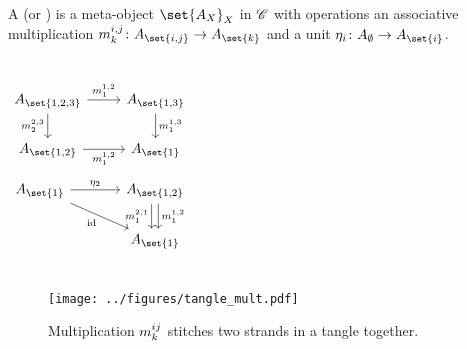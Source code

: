 \documentclass{beamer}
\begin{document}
\begin{frame}
        \begin{definition}\label{def:meta_algebra}
                A  (or ) is a meta-object
                $\set{A_X}_X$ in $\mathscr{C}$ with operations an associative
                multiplication $\map {\mult^{i,j}_{k}} {A_{\set{i,j}}}
                {A_{\set{k}}}$  and a unit
                $\map{\unit_{i}}{A_{\emptyset}}{A_{\set{i}}}$.
        \end{definition}
        \begin{columns}
                \begin{equation*}\label{eq:cd_mult}
                        \begin{tikzcd}[ampersand replacement=\&]
                                A_{\set{1,2,3}}
                                \rar["\mult^{1,2}_{1}"]
                                \dar["\mult^{2,3}_{2}"']
                                \&A_{\set{1,3}}
                                \dar["\mult^{1,3}_{1}"] \\
                                A_{\set{1,2}}
                                \rar["\mult^{1,2}_{1}"']
                                \&A_{\set{1}}
                        \end{tikzcd}
                \end{equation*}
                \begin{equation*}\label{eq:cd_unit}
                \begin{tikzcd}[ampersand replacement=\&,column sep=large]
                        A_{\set{1}}
                                \rar["\unit_{2}"]
                                \drar["\id"']
                        \&A_{\set{1,2}}
                                \dar["\mult^{1,2}_{1}", shift left]
                                \dar["\mult^{2,1}_{1}"', shift right] \\
                        \&A_{\set{1}}
                \end{tikzcd}
                \end{equation*}
        \end{columns}
\end{frame}

\begin{frame}
        \begin{figure}
        \centering
        \texttt{[image: ../figures/tangle\_mult.pdf]}
        \caption{
                Multiplication $m^{ij}_{k}$ stitches two strands in a tangle
                together.
        }
        \label{fig:tangle_mult}
\end{figure}
\end{frame}
\end{document}
